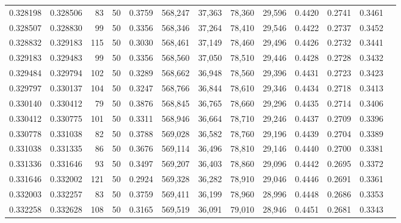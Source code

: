 \begin{tabular}{rrrrrrrrrrrrr}
0.328198 & 0.328506 &    83 &  50 &                                     0.3759 & 568,247 &  37,363 &  78,360 &  29,596 & 0.4420 & 0.2741 & 0.3461 \\
0.328507 & 0.328830 &    99 &  50 &                                     0.3356 & 568,346 &  37,264 &  78,410 &  29,546 & 0.4422 & 0.2737 & 0.3452 \\
0.328832 & 0.329183 &   115 &  50 &                                     0.3030 & 568,461 &  37,149 &  78,460 &  29,496 & 0.4426 & 0.2732 & 0.3441 \\
0.329183 & 0.329483 &    99 &  50 &                                     0.3356 & 568,560 &  37,050 &  78,510 &  29,446 & 0.4428 & 0.2728 & 0.3432 \\
0.329484 & 0.329794 &   102 &  50 &                                     0.3289 & 568,662 &  36,948 &  78,560 &  29,396 & 0.4431 & 0.2723 & 0.3423 \\
0.329797 & 0.330137 &   104 &  50 &                                     0.3247 & 568,766 &  36,844 &  78,610 &  29,346 & 0.4434 & 0.2718 & 0.3413 \\
0.330140 & 0.330412 &    79 &  50 &                                     0.3876 & 568,845 &  36,765 &  78,660 &  29,296 & 0.4435 & 0.2714 & 0.3406 \\
0.330412 & 0.330775 &   101 &  50 &                                     0.3311 & 568,946 &  36,664 &  78,710 &  29,246 & 0.4437 & 0.2709 & 0.3396 \\
0.330778 & 0.331038 &    82 &  50 &                                     0.3788 & 569,028 &  36,582 &  78,760 &  29,196 & 0.4439 & 0.2704 & 0.3389 \\
0.331038 & 0.331335 &    86 &  50 &                                     0.3676 & 569,114 &  36,496 &  78,810 &  29,146 & 0.4440 & 0.2700 & 0.3381 \\
0.331336 & 0.331646 &    93 &  50 &                                     0.3497 & 569,207 &  36,403 &  78,860 &  29,096 & 0.4442 & 0.2695 & 0.3372 \\
0.331646 & 0.332002 &   121 &  50 &                                     0.2924 & 569,328 &  36,282 &  78,910 &  29,046 & 0.4446 & 0.2691 & 0.3361 \\
0.332003 & 0.332257 &    83 &  50 &                                     0.3759 & 569,411 &  36,199 &  78,960 &  28,996 & 0.4448 & 0.2686 & 0.3353 \\
0.332258 & 0.332628 &   108 &  50 &                                     0.3165 & 569,519 &  36,091 &  79,010 &  28,946 & 0.4451 & 0.2681 & 0.3343 \\

\end{tabular}
